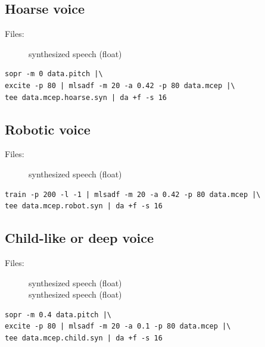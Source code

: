 \documentclass[a4paper,10pt]{article}
\begin{document}
\subsection{Hoarse voice}

\begin{description}
\item[Files:]
  synthesized speech (float)\\
\end{description}

\begin{verbatim}
sopr -m 0 data.pitch |\
excite -p 80 | mlsadf -m 20 -a 0.42 -p 80 data.mcep |\
tee data.mcep.hoarse.syn | da +f -s 16 
\end{verbatim}

\subsection{Robotic voice}

\begin{description}
\item[Files:]
  synthesized speech (float)
\end{description}

\begin{verbatim}
train -p 200 -l -1 | mlsadf -m 20 -a 0.42 -p 80 data.mcep |\
tee data.mcep.robot.syn | da +f -s 16
\end{verbatim}

\subsection{Child-like or deep voice}

\begin{description}
\item[Files:]
  synthesized speech (float)\\
  synthesized speech (float)
\end{description}

\begin{verbatim}
sopr -m 0.4 data.pitch |\
excite -p 80 | mlsadf -m 20 -a 0.1 -p 80 data.mcep |\
tee data.mcep.child.syn | da +f -s 16
\end{verbatim}
\end{document}
